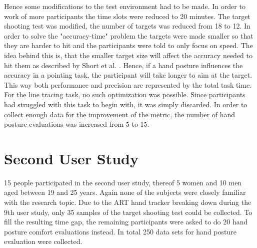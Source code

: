 Hence some modifications to the test environment had to be made. In order to work of more participants the time slots were reduced to 20 minutes. The target shooting test was modified, the number of targets was reduced from 18 to 12. In order to solve the "accuracy-time" problem the targets were made smaller so that they are harder to hit and the participants were told to only focus on speed. The idea behind this is, that the smaller target size will affect the accuracy needed to hit them as described by Short et al. \cite{short1999precision}. Hence, if a hand posture influences the accuracy in a pointing task, the participant will take longer to aim at the target. This way both performance and precision are represented by the total task time. 
For the line tracing task, no such optimization was possible. Since participants had struggled with this task to begin with, it was simply discarded.
In order to collect enough data for the improvement of the metric, the number of hand posture evaluations was increased from 5 to 15.

\section{Second User Study}

15 people participated in the second user study, thereof 5 women and 10 men aged between 19 and 25 years. Again none of the subjects were closely familiar with the research topic.
Due to the ART hand tracker breaking down during the 9th user study, only 35 samples of the target shooting test could be collected. To fill the resulting time gap, the remaining participants were asked to do 20 hand posture comfort evaluations instead.
In total 250 data sets for hand posture evaluation were collected.